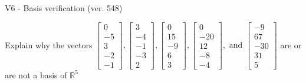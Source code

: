 \begin{exercise}
  \begin{exerciseTitle}V6 - Basis verification (ver. 548)\end{exerciseTitle}
  \begin{exerciseStatement}
    Explain why the vectors \(\left[\begin{array}{r}
0 \\
-5 \\
3 \\
-2 \\
-1
\end{array}\right] , \left[\begin{array}{r}
3 \\
-4 \\
-1 \\
-3 \\
2
\end{array}\right] , \left[\begin{array}{r}
0 \\
15 \\
-9 \\
6 \\
3
\end{array}\right] , \left[\begin{array}{r}
0 \\
-20 \\
12 \\
-8 \\
-4
\end{array}\right] , \text{ and } \left[\begin{array}{r}
-9 \\
67 \\
-30 \\
31 \\
5
\end{array}\right]\) are or are not a basis of \(\mathbb{R}^5\)	



\end{exerciseStatement}
\end{exercise}
